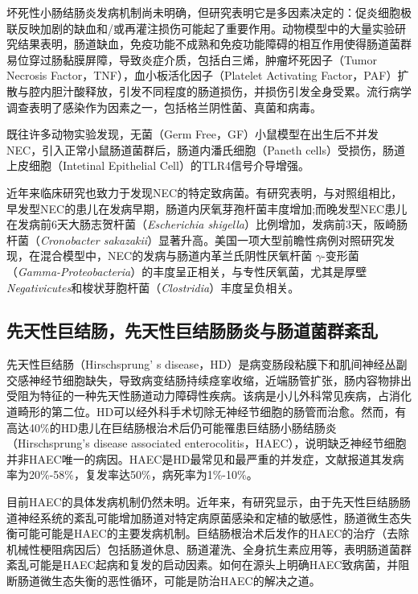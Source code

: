 坏死性小肠结肠炎发病机制尚未明确，但研究表明它是多因素决定的：促炎细胞极联反映加剧的缺血和/或再灌注损伤可能起了重要作用。动物模型中的大量实验研究结果表明，肠道缺血，免疫功能不成熟和免疫功能障碍的相互作用使得肠道菌群易位穿过肠黏膜屏障，导致炎症介质，包括白三烯，肿瘤坏死因子（Tumor Necrosis Factor，TNF），血小板活化因子（Platelet Activating Factor，PAF）扩散与腔内胆汁酸释放，引发不同程度的肠道损伤，并损伤引发全身受累\cite{good2015breast,miller1990casein}。流行病学调查表明了感染作为因素之一，包括格兰阴性菌、真菌和病毒\cite{de2004early,hodzic2017role,denning2017pathogenesis}。

既往许多动物实验发现，无菌（Germ Free，GF）小鼠模型在出生后不并发NEC\cite{rozenfeld2001role}，引入正常小鼠肠道菌群后，肠道内潘氏细胞（Paneth cells）受损伤，肠道上皮细胞（Intetinal Epithelial Cell）的TLR4信号介导增强\cite{white2017paneth}。

近年来临床研究也致力于发现NEC的特定致病菌。有研究表明，与对照组相比，早发型NEC的患儿在发病早期，肠道内厌氧芽孢杆菌丰度增加;而晚发型NEC患儿在发病前6天大肠志贺杆菌（\textit{Escherichia shigella}）比例增加，发病前3天，阪崎肠杆菌（\textit{Cronobacter sakazakii}）显著升高\cite{zhou2015longitudinal}。美国一项大型前瞻性病例对照研究发现，在混合模型中，NEC的发病与肠道内革兰氏阴性厌氧杆菌 $\gamma$-变形菌（\textit{Gamma-Proteobacteria}）的丰度呈正相关，与专性厌氧菌，尤其是厚壁\textit{Negativicutes}和梭状芽胞杆菌（\textit{Clostridia}）丰度呈负相关\cite{la2014patterned}。

\subsection{先天性巨结肠，先天性巨结肠肠炎与肠道菌群紊乱}
先天性巨结肠（Hirschsprung’ s disease，HD）是病变肠段粘膜下和肌间神经丛副交感神经节细胞缺失，导致病变结肠持续痉挛收缩，近端肠管扩张，肠内容物排出受阻为特征的一种先天性肠道动力障碍性疾病。该病是小儿外科常见疾病，占消化道畸形的第二位\cite{langer1999transanal}。HD可以经外科手术切除无神经节细胞的肠管而治愈。然而，有高达40\%的HD患儿在巨结肠根治术后仍可能罹患巨结肠小肠结肠炎（Hirschsprung’s disease associated enterocolitis，HAEC），说明缺乏神经节细胞并非HAEC唯一的病因。HAEC是HD最常见和最严重的并发症，文献报道其发病率为20\%-58\%，复发率达50\%，病死率为1\%-10\%\cite{frykman2012hirschsprung}。

目前HAEC的具体发病机制仍然未明\cite{austin2012pathogenesis}。近年来，有研究显示，由于先天性巨结肠肠道神经系统的紊乱可能增加肠道对特定病原菌感染和定植的敏感性，肠道微生态失衡可能可能是HAEC的主要发病机制\cite{frykman2012hirschsprung}。巨结肠根治术后发作的HAEC的治疗（去除机械性梗阻病因后）包括肠道休息、肠道灌洗、全身抗生素应用等，表明肠道菌群紊乱可能是HAEC起病和复发的启动因素。如何在源头上明确HAEC致病菌，并阻断肠道微生态失衡的恶性循环，可能是防治HAEC的解决之道。

